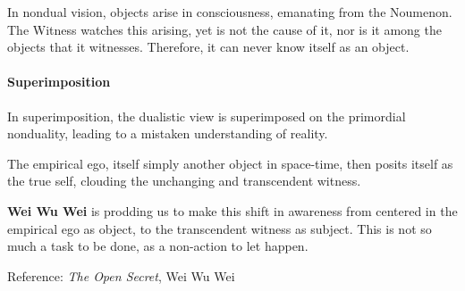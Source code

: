 In nondual vision, objects arise in consciousness, emanating from the Noumenon. The Witness watches this arising, yet is not the cause of it, nor is it among the objects that it witnesses. Therefore, it can never know itself as an object.


\paragraph{Superimposition}

In superimposition, the dualistic view is superimposed on the primordial nonduality, leading to a mistaken understanding of reality.

The empirical ego, itself simply another object in space-time, then posits itself as the true self, clouding the unchanging and transcendent witness.

\textbf{Wei Wu Wei} is prodding us to make this shift in awareness from centered in the empirical ego as object, to the transcendent witness as subject. This is not so much a task to be done, as a non-action to let happen.

{Reference: \emph{The Open Secret}, Wei Wu Wei}



